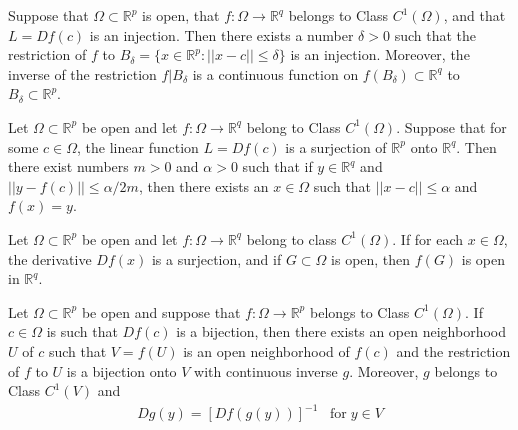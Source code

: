 \documentclass[12pt]{article}
\newcommand{\R}{\mathbb{R}}
\newenvironment{theorem}[2][Theorem]{\begin{trivlist}
\item[\hskip \labelsep {\bfseries #1}\hskip \labelsep {\bfseries #2.}]}{\end{trivlist}}
\begin{document}
\begin{theorem}[Injective Mapping]{Theorem}
Suppose that $\Omega \subset \R^p$ is open, that $f: \Omega \to \R^q$ belongs to Class $C^1(\Omega)$, and that $L = Df(c)$ is an injection. Then there exists a number $\delta > 0$ such that the restriction of $f$ to $B_{\delta} = \{x \in \R^p: ||x - c|| \leq \delta\}$ is an injection. Moreover, the inverse of the restriction $f \rvert B_{\delta}$ is a continuous function on $f(B_{\delta}) \subset \R^q$ to $B_{\delta} \subset \R^p$.
\end{theorem}

\begin{theorem}[Surjective Mapping]{Theorem}
Let $\Omega \subset \R^p$ be open and let $f: \Omega \to \R^q$ belong to Class $C^1(\Omega)$. Suppose that for some $c \in \Omega$, the linear function $L = Df(c)$ is a surjection of $\R^p$ onto $\R^q$. Then there exist numbers $m > 0$ and $\alpha > 0$ such that if $y \in \R^q$ and $||y - f(c)|| \leq \alpha/2m$, then there exists an $x \in \Omega$ such that $||x - c|| \leq \alpha$ and $f(x) = y$.
\end{theorem}

\begin{theorem}[Open Mapping]{Theorem}
Let $\Omega \subset \R^p$ be open and let $f: \Omega \to \R^q$ belong to class $C^1(\Omega)$. If for each $x \in \Omega$, the derivative $Df(x)$ is a surjection, and if $G \subset \Omega$ is open, then $f(G)$ is open in $\R^q$.
\end{theorem}

\begin{theorem}[Inversion Mapping]{Theorem}
Let $\Omega \subset \R^p$ be open and suppose that $f: \Omega \to \R^p$ belongs to Class $C^1(\Omega)$. If $c \in \Omega$ is such that $Df(c)$ is a bijection, then there exists an open neighborhood $U$ of $c$ such that $V = f(U)$ is an open neighborhood of $f(c)$ and the restriction of $f$ to $U$ is a bijection onto $V$ with continuous inverse $g$. Moreover, $g$ belongs to Class $C^1(V)$ and
\begin{align*}
Dg(y) = [Df(g(y))]^{-1} \; \; \; \text{for} \; y \in V
\end{align*}
\end{theorem}
\end{document}
